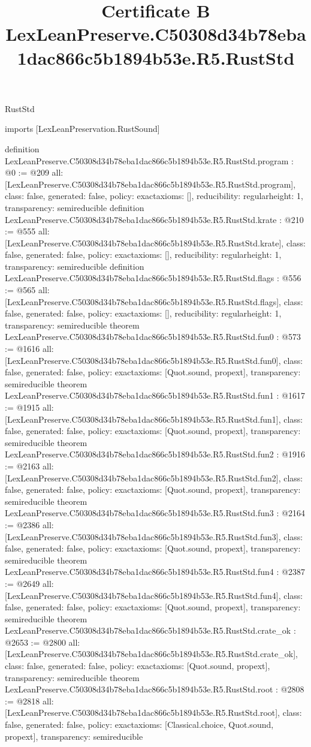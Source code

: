 \begin{lexlean}{RustStd}
\title{Certificate B LexLeanPreserve.C50308d34b78eba1dac866c5b1894b53e.R5.RustStd}
\begin{coremodule}
imports [LexLeanPreservation.RustSound]

definition LexLeanPreserve.C50308d34b78eba1dac866c5b1894b53e.R5.RustStd.program : @0 := @209 {
  all: [LexLeanPreserve.C50308d34b78eba1dac866c5b1894b53e.R5.RustStd.program],
  class: false,
  generated: false,
  policy: exact{axioms: []},
  reducibility: regular{height: 1},
  transparency: semireducible
}
definition LexLeanPreserve.C50308d34b78eba1dac866c5b1894b53e.R5.RustStd.krate : @210 := @555 {
  all: [LexLeanPreserve.C50308d34b78eba1dac866c5b1894b53e.R5.RustStd.krate],
  class: false,
  generated: false,
  policy: exact{axioms: []},
  reducibility: regular{height: 1},
  transparency: semireducible
}
definition LexLeanPreserve.C50308d34b78eba1dac866c5b1894b53e.R5.RustStd.flags : @556 := @565 {
  all: [LexLeanPreserve.C50308d34b78eba1dac866c5b1894b53e.R5.RustStd.flags],
  class: false,
  generated: false,
  policy: exact{axioms: []},
  reducibility: regular{height: 1},
  transparency: semireducible
}
theorem LexLeanPreserve.C50308d34b78eba1dac866c5b1894b53e.R5.RustStd.fun0 : @573 := @1616 {
  all: [LexLeanPreserve.C50308d34b78eba1dac866c5b1894b53e.R5.RustStd.fun0],
  class: false,
  generated: false,
  policy: exact{axioms: [Quot.sound, propext]},
  transparency: semireducible
}
theorem LexLeanPreserve.C50308d34b78eba1dac866c5b1894b53e.R5.RustStd.fun1 : @1617 := @1915 {
  all: [LexLeanPreserve.C50308d34b78eba1dac866c5b1894b53e.R5.RustStd.fun1],
  class: false,
  generated: false,
  policy: exact{axioms: [Quot.sound, propext]},
  transparency: semireducible
}
theorem LexLeanPreserve.C50308d34b78eba1dac866c5b1894b53e.R5.RustStd.fun2 : @1916 := @2163 {
  all: [LexLeanPreserve.C50308d34b78eba1dac866c5b1894b53e.R5.RustStd.fun2],
  class: false,
  generated: false,
  policy: exact{axioms: [Quot.sound, propext]},
  transparency: semireducible
}
theorem LexLeanPreserve.C50308d34b78eba1dac866c5b1894b53e.R5.RustStd.fun3 : @2164 := @2386 {
  all: [LexLeanPreserve.C50308d34b78eba1dac866c5b1894b53e.R5.RustStd.fun3],
  class: false,
  generated: false,
  policy: exact{axioms: [Quot.sound, propext]},
  transparency: semireducible
}
theorem LexLeanPreserve.C50308d34b78eba1dac866c5b1894b53e.R5.RustStd.fun4 : @2387 := @2649 {
  all: [LexLeanPreserve.C50308d34b78eba1dac866c5b1894b53e.R5.RustStd.fun4],
  class: false,
  generated: false,
  policy: exact{axioms: [Quot.sound, propext]},
  transparency: semireducible
}
theorem LexLeanPreserve.C50308d34b78eba1dac866c5b1894b53e.R5.RustStd.crate_ok : @2653 := @2800 {
  all: [LexLeanPreserve.C50308d34b78eba1dac866c5b1894b53e.R5.RustStd.crate_ok],
  class: false,
  generated: false,
  policy: exact{axioms: [Quot.sound, propext]},
  transparency: semireducible
}
theorem LexLeanPreserve.C50308d34b78eba1dac866c5b1894b53e.R5.RustStd.root : @2808 := @2818 {
  all: [LexLeanPreserve.C50308d34b78eba1dac866c5b1894b53e.R5.RustStd.root],
  class: false,
  generated: false,
  policy: exact{axioms: [Classical.choice, Quot.sound, propext]},
  transparency: semireducible
}


\end{coremodule}
\end{lexlean}
